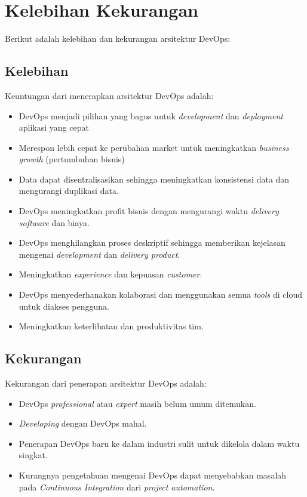 \section{Kelebihan Kekurangan}
Berikut adalah kelebihan dan kekurangan arsitektur DevOps:

\subsection{Kelebihan}
Keuntungan dari menerapkan arsitektur DevOps adalah:
\begin{itemize}
	\item DevOps menjadi pilihan yang bagus untuk \textit{development} dan \textit{deployment} aplikasi yang cepat
	\item Merespon lebih cepat ke perubahan market untuk meningkatkan \textit{business growth} (pertumbuhan bisnis)
	\item Data dapat disentralisasikan sehingga meningkatkan konsistensi data dan mengurangi duplikasi data.
	\item DevOps meningkatkan profit bisnis dengan mengurangi waktu \textit{delivery software} dan biaya.
	\item DevOps menghilangkan proses deskriptif sehingga memberikan kejelasan mengenai \textit{development} dan \textit{delivery product}.
	\item Meningkatkan \textit{experience} dan kepuasan \textit{customer}.
	\item DevOps menyederhanakan kolaborasi dan menggunakan semua \textit{tools} di cloud untuk diakses pengguna.
	\item Meningkatkan keterlibatan dan produktivitas tim.
\end{itemize}
\subsection{Kekurangan}
Kekurangan dari penerapan arsitektur DevOps adalah:
\begin{itemize}
	\item DevOps \textit{professional} atau \textit{expert} masih belum umum ditemukan.
	\item \textit{Developing} dengan DevOps mahal.
	\item Penerapan DevOps baru ke dalam industri sulit untuk dikelola dalam waktu singkat.
	\item 	Kurangnya pengetahuan mengenai DevOps dapat menyebabkan masalah pada \textit{Continuous Integration} dari \textit{project automation}.
\end{itemize}
